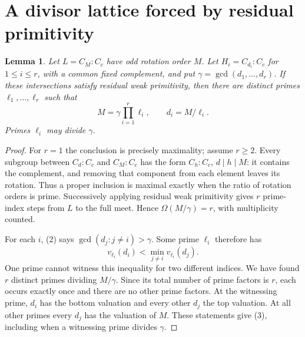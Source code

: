 \documentclass[11pt,a4paper]{article}
\newtheorem{lemma}{Lemma}\newtheorem{theorem}[lemma]{Theorem}
\begin{document}
\section{A divisor lattice forced by residual primitivity}
\begin{lemma}\label{divisors}
Let $L=C_M:C_c$ have odd rotation order $M$. Let
$H_i=C_{d_i}:C_c$ for $1\le i\le r$, with a common fixed complement,
and put $\gamma=\gcd(d_1,\ldots,d_r)$. If these intersections satisfy
residual weak primitivity, then there are distinct primes
$\ell_1,\ldots,\ell_r$ such that
\[
 M=\gamma\prod_{i=1}^r\ell_i,
 \qquad d_i=M/\ell_i.                         \tag{3}
\]
Primes $\ell_i$ may divide $\gamma$.
\end{lemma}
\begin{proof}
For $r=1$ the conclusion is precisely maximality; assume $r\ge2$.
Every subgroup between $C_d:C_c$ and $C_M:C_c$ has the form
$C_h:C_c$, $d\mid h\mid M$: it contains the complement, and
removing that component from each element leaves its rotation.
Thus a proper inclusion is maximal exactly when the ratio of
rotation orders is prime. Successively applying residual weak
primitivity gives $r$ prime-index steps from $L$ to the full meet.
Hence $\Omega(M/\gamma)=r$, with multiplicity counted.

For each $i$, (2) says
$\gcd(d_j:j\ne i)>\gamma$. Some prime $\ell_i$ therefore has
\[
 v_{\ell_i}(d_i)<\min_{j\ne i}v_{\ell_i}(d_j).
\]
One prime cannot witness this inequality for two different indices.
We have found $r$ distinct primes dividing $M/\gamma$. Since its
total number of prime factors is $r$, each occurs exactly once and
there are no other prime factors. At the witnessing prime, $d_i$
has the bottom valuation and every other $d_j$ the top valuation.
At all other primes every $d_j$ has the valuation of $M$. These
statements give (3), including when a witnessing prime divides
$\gamma$.
\end{proof}
\end{document}
